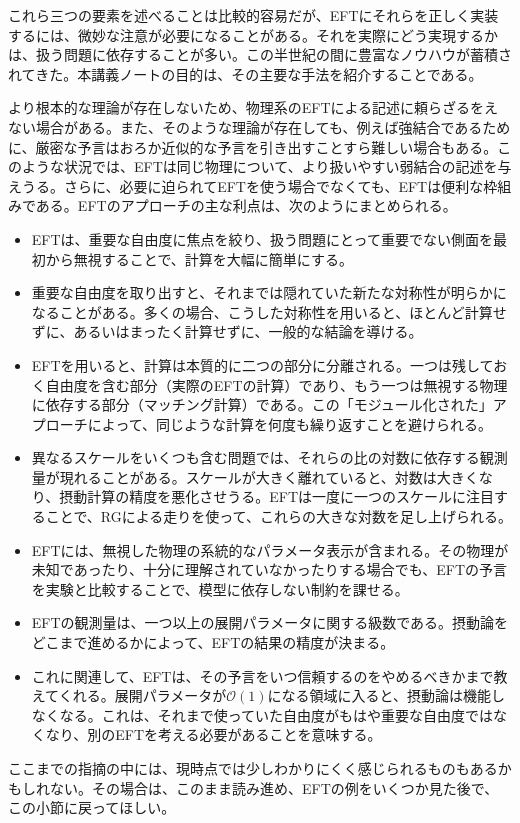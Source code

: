 これら三つの要素を述べることは比較的容易だが、EFTにそれらを正しく実装するには、微妙な注意が必要になることがある。それを実際にどう実現するかは、扱う問題に依存することが多い。この半世紀の間に豊富なノウハウが蓄積されてきた。本講義ノートの目的は、その主要な手法を紹介することである。





より根本的な理論が存在しないため、物理系のEFTによる記述に頼らざるをえない場合がある。また、そのような理論が存在しても、例えば強結合であるために、厳密な予言はおろか近似的な予言を引き出すことすら難しい場合もある。このような状況では、EFTは同じ物理について、より扱いやすい弱結合の記述を与えうる。さらに、必要に迫られてEFTを使う場合でなくても、EFTは便利な枠組みである。EFTのアプローチの主な利点は、次のようにまとめられる。
%
\begin{itemize}
\item EFTは、重要な自由度に焦点を絞り、扱う問題にとって重要でない側面を最初から無視することで、計算を大幅に簡単にする。
\item 重要な自由度を取り出すと、それまでは隠れていた新たな対称性が明らかになることがある。多くの場合、こうした対称性を用いると、ほとんど計算せずに、あるいはまったく計算せずに、一般的な結論を導ける。
\item EFTを用いると、計算は本質的に二つの部分に分離される。一つは残しておく自由度を含む部分（実際のEFTの計算）であり、もう一つは無視する物理に依存する部分（マッチング計算）である。この「モジュール化された」アプローチによって、同じような計算を何度も繰り返すことを避けられる。
\item 異なるスケールをいくつも含む問題では、それらの比の対数に依存する観測量が現れることがある。スケールが大きく離れていると、対数は大きくなり、摂動計算の精度を悪化させうる。EFTは一度に一つのスケールに注目することで、RGによる走りを使って、これらの大きな対数を足し上げられる。
\item EFTには、無視した物理の系統的なパラメータ表示が含まれる。その物理が未知であったり、十分に理解されていなかったりする場合でも、EFTの予言を実験と比較することで、模型に依存しない制約を課せる。
\item EFTの観測量は、一つ以上の展開パラメータに関する級数である。摂動論をどこまで進めるかによって、EFTの結果の精度が決まる。
\item これに関連して、EFTは、その予言をいつ信頼するのをやめるべきかまで教えてくれる。展開パラメータが$\mathcal{O}(1)$になる領域に入ると、摂動論は機能しなくなる。これは、それまで使っていた自由度がもはや重要な自由度ではなくなり、別のEFTを考える必要があることを意味する。
\end{itemize}
%
ここまでの指摘の中には、現時点では少しわかりにくく感じられるものもあるかもしれない。その場合は、このまま読み進め、EFTの例をいくつか見た後で、この小節に戻ってほしい。 \\

